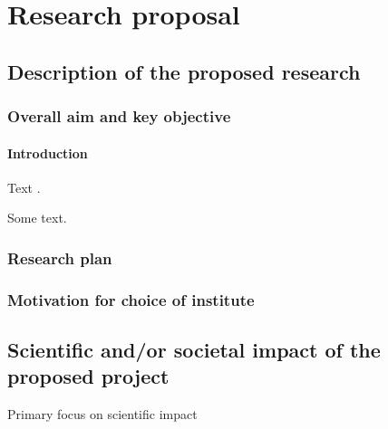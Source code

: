 \section{Research proposal}\label{sec:proposal}

\subsection{Description of the proposed research}\label{sec:research}

\subsubsection{Overall aim and key objective}\label{sec:aim}

\paragraph{Introduction}\label{sec:intro}

Text \cite{clarke2018}.

\begin{mdframed}
    Some text.
\end{mdframed}

\subsubsection{Research plan}\label{sec:plan}


\subsubsection{Motivation for choice of institute}\label{sec:institute}



\newpage
\subsection{Scientific and/or societal impact of the proposed project}\label{sec:KU}

Primary focus on scientific impact


